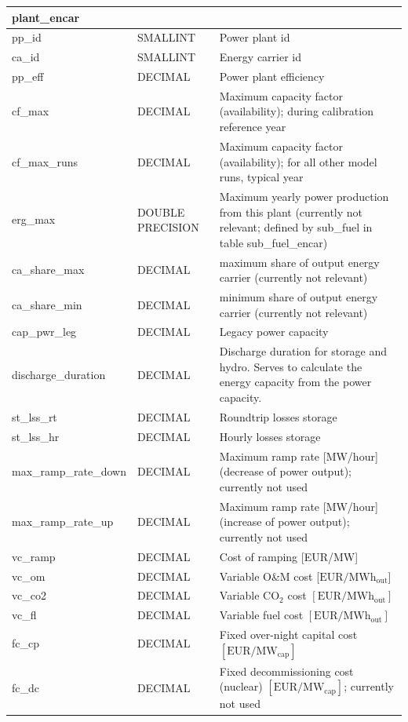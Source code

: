\documentclass[]{article}
\begin{document}
\begin{itemize}
\begin{tabular}{@{}llp{8cm}@{}}
\toprule
plant\_encar & & \\
\midrule
pp\_id & SMALLINT & Power plant id \\
ca\_id & SMALLINT & Energy carrier id \\
pp\_eff & DECIMAL & Power plant efficiency \\
cf\_max & DECIMAL & Maximum capacity factor (availability); during calibration reference year \\
cf\_max\_runs & DECIMAL & Maximum capacity factor (availability); for all other model runs, typical year \\
erg\_max & DOUBLE PRECISION & Maximum yearly power production from this plant (currently not relevant; defined by sub\_fuel in table sub\_fuel\_encar) \\
ca\_share\_max & DECIMAL & maximum share of output energy carrier (currently not relevant) \\
ca\_share\_min & DECIMAL & minimum share of output energy carrier (currently not relevant) \\
cap\_pwr\_leg & DECIMAL & Legacy power capacity \\
discharge\_duration & DECIMAL & Discharge duration for storage and hydro. Serves to calculate the energy capacity from the power capacity. \\
st\_lss\_rt & DECIMAL & Roundtrip losses storage \\
st\_lss\_hr & DECIMAL & Hourly losses storage \\
max\_ramp\_rate\_down & DECIMAL & Maximum ramp rate {[}MW/hour{]} (decrease of power output); currently not used \\
max\_ramp\_rate\_up & DECIMAL & Maximum ramp rate {[}MW/hour{]} (increase of power output); currently not used \\
vc\_ramp & DECIMAL & Cost of ramping {[}EUR/MW{]} \\
vc\_om & DECIMAL & Variable O\&M cost {[}$\mathrm{EUR/MWh_{out}}${]} \\
vc\_co2 & DECIMAL & Variable $\mathrm{CO_2}$ cost $[\mathrm{EUR/MWh_{out}}]$ \\
vc\_fl & DECIMAL & Variable fuel cost $[\mathrm{EUR/MWh_{out}}]$ \\
fc\_cp & DECIMAL & Fixed over-night capital cost $[\mathrm{EUR/MW_{cap}}]$ \\
fc\_dc & DECIMAL & Fixed decommissioning cost (nuclear) $[\mathrm{EUR/MW_{cap}}]$; currently not used \\

\end{tabular}
\end{itemize}
\end{document}
